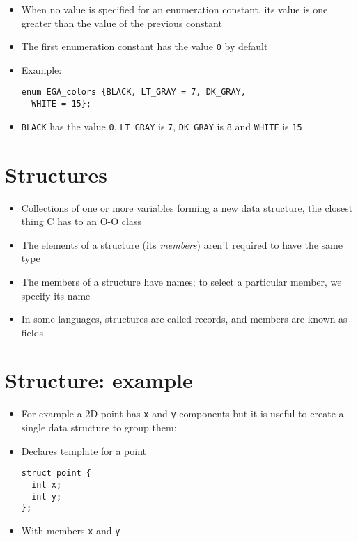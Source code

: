 \documentclass{article}
\begin{document}
\begin{itemize}
\item When no value is specified for an enumeration constant, its value is one greater than the value of the previous constant
\item The first enumeration constant has the value \verb!0! by default

\item Example:
\begin{verbatim}
enum EGA_colors {BLACK, LT_GRAY = 7, DK_GRAY,
  WHITE = 15};
\end{verbatim}
\item \verb!BLACK! has the value \verb!0!, \verb!LT_GRAY! is \verb!7!, \verb!DK_GRAY! is \verb!8! and \verb!WHITE! is \verb!15!
\end{itemize}



\section{Structures}
\begin{itemize}
\item Collections of one or more variables forming a new data structure, the closest thing C has to an O-O class

\item The elements of a structure (its \emph{members}) aren't required to have the same type

\item The members of a structure have names; to select a particular member, we specify its name

\item In some languages, structures are called records, and members are known as fields
\end{itemize}



\section{Structure: example}
\begin{itemize}
\item For example a 2D point has \verb!x! and \verb!y! components but it is useful to create a single data structure to group them: 


\item Declares template for a point

\begin{verbatim}
struct point {
  int x;
  int y;
};
\end{verbatim}

\item With members \verb!x! and \verb!y!
\end{itemize}
\end{document}
